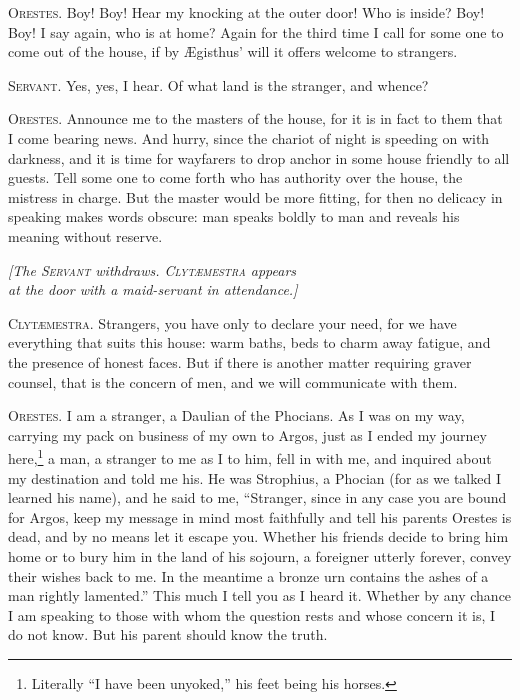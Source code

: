 \documentclass[12pt]{article}
\begin{document}
\textsc{Orestes.} Boy! Boy! Hear my knocking at the outer door! Who is inside? Boy! Boy! I say again, who is at home? Again for the third time I call for some one to come out of the house, if by {\AE}gisthus' will it offers welcome to strangers.

\textsc{Servant.} Yes, yes, I hear. Of what land is the stranger, and whence?

\textsc{Orestes.} Announce me to the masters of the house, for it is in fact to them that I come bearing news. And hurry, since the chariot of night is speeding on with darkness, and it is time for wayfarers to drop anchor in some house friendly to all guests. Tell some one to come forth who has authority over the house, the mistress in charge. But the master would be more fitting, for then no delicacy in speaking makes words obscure: man speaks boldly to man and reveals his meaning without reserve.

\begin{center}
\textit{[The \textsc{Servant} withdraws. \textsc{Clyt{\ae}mestra} appears\\
at the door with a maid-servant in attendance.]}
\end{center}

\textsc{Clyt{\ae}mestra.} Strangers, you have only to declare your need, for we have everything that suits this house: warm baths, beds to charm away fatigue, and the presence of honest faces. But if there is another matter requiring graver counsel, that is the concern of men, and we will communicate with them.

\textsc{Orestes.} I am a stranger, a Daulian of the Phocians. As I was on my way, carrying my pack on business of my own to Argos, just as I ended my journey here,\footnote{Literally ``I have been unyoked,'' his feet being his horses.} a man, a stranger to me as I to him, fell in with me, and inquired about my destination and told me his. He was Strophius, a Phocian (for as we talked I learned his name), and he said to me, ``Stranger, since in any case you are bound for Argos, keep my message in mind most faithfully and tell his parents Orestes is dead, and by no means let it escape you. Whether his friends decide to bring him home or to bury him in the land of his sojourn, a foreigner utterly forever, convey their wishes back to me. In the meantime a bronze urn contains the ashes of a man rightly lamented.'' This much I tell you as I heard it. Whether by any chance I am speaking to those with whom the question rests and whose concern it is, I do not know. But his parent should know the truth.
\end{document}
